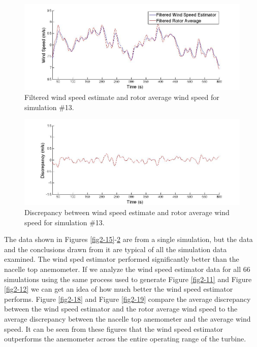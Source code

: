 \begin{figure}[htbp]
	\centering
		\includegraphics[width = \linewidth]{Figures/ch2Figures/fig2-16.jpg}
		
	\caption{Filtered wind speed estimate and rotor average wind speed for simulation \#13.}
	\label{fig2-16}
\end{figure}



\begin{figure}[htbp]
	\centering
		\includegraphics[width = \linewidth]{Figures/ch2Figures/fig2-17.jpg}
		
	\caption{Discrepancy between wind speed estimate and rotor average wind speed for simulation \#13.}
	\label{fig2-17}
\end{figure}

The data shown in Figures \ref{fig2-15}-\ref{fig2-17} are from a single simulation, but the data and the conclusions drawn from it are typical of all the simulation data examined. The wind sped estimator performed significantly better than the nacelle top anemometer. If we analyze the wind speed estimator data for all 66 simulations using the same process used to generate Figure \ref{fig2-11} and Figure \ref{fig2-12} we can get an idea of how much better the wind speed estimator performs. Figure \ref{fig2-18} and Figure \ref{fig2-19} compare the average discrepancy between the wind speed estimator and the rotor average wind speed to the average discrepancy between the nacelle top anemometer and the average wind speed. It can be seen from these figures that the wind speed estimator outperforms the anemometer across the entire operating range of the turbine. 


